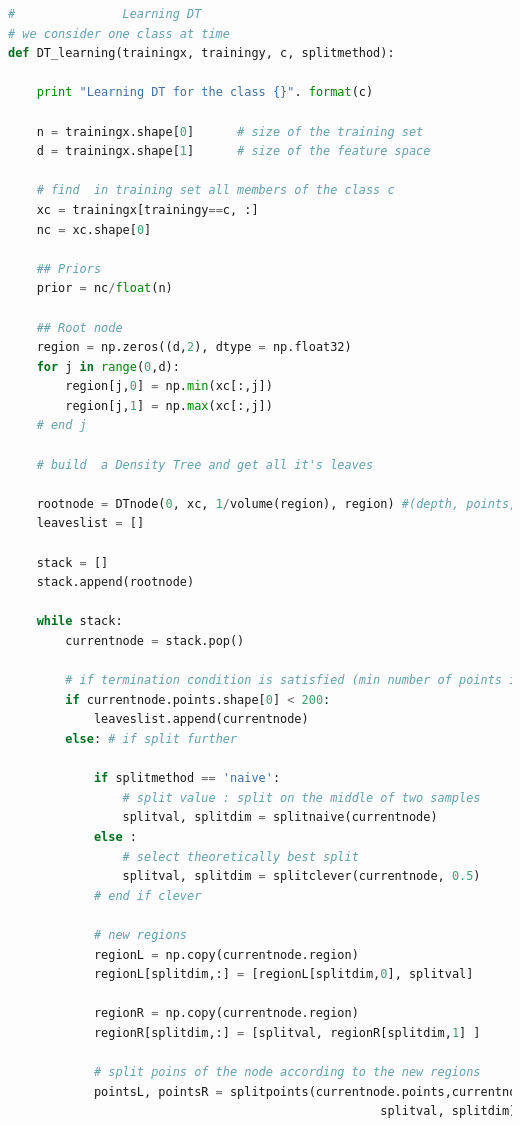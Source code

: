 \documentclass{article}
\begin{document}
\begin{lstlisting}[language=Python]
#               Learning DT         
# we consider one class at time    
def DT_learning(trainingx, trainingy, c, splitmethod):
    
    print "Learning DT for the class {}". format(c)
    
    n = trainingx.shape[0]      # size of the training set
    d = trainingx.shape[1]      # size of the feature space
    
    # find  in training set all members of the class c
    xc = trainingx[trainingy==c, :]        
    nc = xc.shape[0]

    ## Priors
    prior = nc/float(n)
    
    ## Root node
    region = np.zeros((d,2), dtype = np.float32)
    for j in range(0,d):
        region[j,0] = np.min(xc[:,j])
        region[j,1] = np.max(xc[:,j])
    # end j   
      
    # build  a Density Tree and get all it's leaves  
      
    rootnode = DTnode(0, xc, 1/volume(region), region) #(depth, points, p, region)
    leaveslist = []

    stack = []
    stack.append(rootnode)
    
    while stack:
        currentnode = stack.pop()
  
        # if termination condition is satisfied (min number of points in bin):
        if currentnode.points.shape[0] < 200: 
            leaveslist.append(currentnode)
        else: # if split further
        
            if splitmethod == 'naive':
                # split value : split on the middle of two samples
                splitval, splitdim = splitnaive(currentnode) 
            else :
                # select theoretically best split
                splitval, splitdim = splitclever(currentnode, 0.5)            
            # end if clever
                 
            # new regions
            regionL = np.copy(currentnode.region)
            regionL[splitdim,:] = [regionL[splitdim,0], splitval]
            
            regionR = np.copy(currentnode.region)       
            regionR[splitdim,:] = [splitval, regionR[splitdim,1] ]           
            
            # split poins of the node according to the new regions
            pointsL, pointsR = splitpoints(currentnode.points,currentnode.region, \
                                                    splitval, splitdim)
                

\end{lstlisting}
\end{document}
